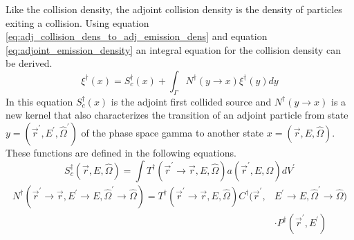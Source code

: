 Like the collision density, the adjoint collision density is the density of
particles exiting a collision. Using equation 
\ref{eq:adj_collision_dens_to_adj_emission_dens} and equation 
\ref{eq:adjoint_emission_density} an integral equation for the collision 
density can be derived.
\begin{equation}
  \xi^{\dagger}(x) = S_c^{\dagger}(x) + \int_{\Gamma} N^{\dagger}(y \to x)
  \xi^{\dagger}(y) dy
  \label{eq:adj_collision_dens_fiesk}
\end{equation}
In this equation $S_c^{\dagger}(x)$ is the adjoint first collided source and
$N^{\dagger}(y \to x)$ is a new kernel that also characterizes the transition
of an adjoint particle from state $y = (\vec{r}^{'},E^{'},\hat{\Omega}^{'})$ of
the phase space gamma to another state $x = (\vec{r},E,\hat{\Omega})$. These
functions are defined in the following equations.
\begin{equation}
  S_c^{\dagger}(\vec{r},E,\hat{\Omega}) = \int 
  T^{\dagger}(\vec{r}^{'} \to \vec{r},E,\hat{\Omega}) a(\vec{r}^{'},E,\hat{\Omega})
  dV^{'}
\end{equation}
\begin{equation}
  \begin{split}
    N^{\dagger}(\vec{r}^{'} \to \vec{r},E^{'} \to E,\hat{\Omega}^{'} \to \hat{\Omega})
    = T^{\dagger}(\vec{r}^{'} \to \vec{r},E,\hat{\Omega})
    C^{\dagger}(\vec{r}^{'},&E^{'} \to E,\hat{\Omega}^{'} \to \hat{\Omega}) \\
    & \cdot P^{\dagger}(\vec{r}^{'},E^{'}) 
  \end{split}
\end{equation}

